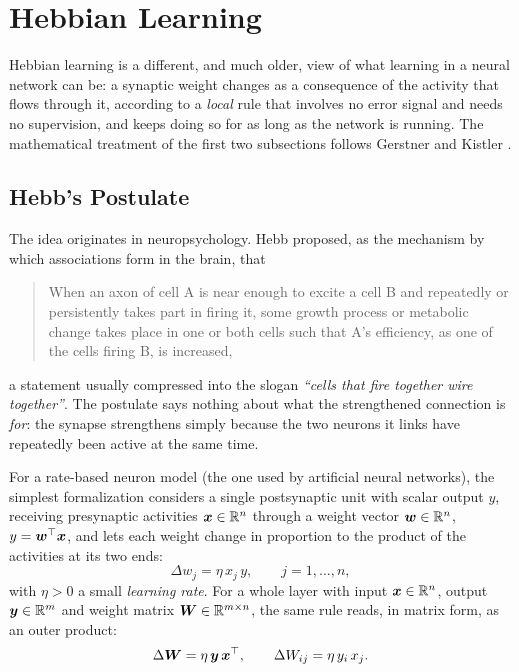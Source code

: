 \section{Hebbian Learning}
\label{sec:hebbian}

Hebbian learning \cite{hebb1949organization} is a different, and much older, view of what learning in a neural network can be: a synaptic weight changes as a consequence of the activity that flows through it, according to a \emph{local} rule that involves no error signal and needs no supervision, and keeps doing so for as long as the network is running. The mathematical treatment of the first two subsections follows Gerstner and Kistler \cite{gerstner2002mathematical, gerstner2002spiking}.

\subsection{Hebb's Postulate}
\label{subsec:hebb-postulate}

The idea originates in neuropsychology. Hebb \cite{hebb1949organization} proposed, as the mechanism by which associations form in the brain, that
\begin{quote}
When an axon of cell A is near enough to excite a cell B and repeatedly or persistently takes part in firing it, some growth process or metabolic change takes place in one or both cells such that A's efficiency, as one of the cells firing B, is increased,
\end{quote}
a statement usually compressed into the slogan \emph{``cells that fire together wire together''}. The postulate says nothing about what the strengthened connection is \emph{for}: the synapse strengthens simply because the two neurons it links have repeatedly been active at the same time.

For a rate-based neuron model (the one used by artificial neural networks), the simplest formalization considers a single postsynaptic unit with scalar output $y$, receiving presynaptic activities $\bm{x} \in \mathbb{R}^{n}$ through a weight vector $\bm{w} \in \mathbb{R}^{n}$, $y = \bm{w}^{\top} \bm{x}$, and lets each weight change in proportion to the product of the activities at its two ends:
\begin{equation}
\Delta w_j = \eta\, x_j\, y, \qquad j = 1, \dots, n,
\label{eq:hebb-basic}
\end{equation}
with $\eta > 0$ a small \emph{learning rate}. For a whole layer with input $\bm{x} \in \mathbb{R}^{n}$, output $\bm{y} \in \mathbb{R}^{m}$ and weight matrix $\bm{W} \in \mathbb{R}^{m \times n}$, the same rule reads, in matrix form, as an outer product:
\begin{equation}
\Delta \bm{W} = \eta\, \bm{y}\, \bm{x}^{\top}, \qquad \Delta W_{ij} = \eta\, y_i\, x_j.
\label{eq:hebb-matrix}
\end{equation}

